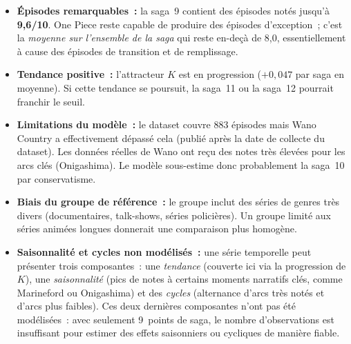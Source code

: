 \documentclass[a4paper,12pt,french]{article}
\begin{document}
\begin{itemize}
  \item \textbf{Épisodes remarquables~:} la saga~9 contient des épisodes notés
        jusqu'à \textbf{9{,}6/10}. One Piece reste capable de produire des
        épisodes d'exception~; c'est la \textit{moyenne sur l'ensemble de la saga}
        qui reste en-deçà de 8{,}0, essentiellement à cause des épisodes de
        transition et de remplissage.
  \item \textbf{Tendance positive~:} l'attracteur $K$ est en progression
        ($+0{,}047$ par saga en moyenne). Si cette tendance se poursuit,
        la saga~11 ou la saga~12 pourrait franchir le seuil.
  \item \textbf{Limitations du modèle~:} le dataset couvre 883 épisodes mais
        Wano Country a effectivement dépassé cela (publié après la date de collecte
        du dataset). Les données réelles de Wano ont reçu des notes très élevées
        pour les arcs clés (Onigashima). Le modèle sous-estime donc probablement
        la saga~10 par conservatisme.
  \item \textbf{Biais du groupe de référence~:} le groupe inclut des séries de
        genres très divers (documentaires, talk-shows, séries policières). Un
        groupe limité aux séries animées longues donnerait une comparaison plus
        homogène.
  \item \textbf{Saisonnalité et cycles non modélisés~:} une série temporelle
        peut présenter trois composantes~: une \textit{tendance} (couverte ici
        via la progression de $K$), une \textit{saisonnalité} (pics de notes à
        certains moments narratifs clés, comme Marineford ou Onigashima) et des
        \textit{cycles} (alternance d'arcs très notés et d'arcs plus faibles).
        Ces deux dernières composantes n'ont pas été modélisées~: avec seulement
        9~points de saga, le nombre d'observations est insuffisant pour estimer
        des effets saisonniers ou cycliques de manière fiable.
\end{itemize}
\end{document}
